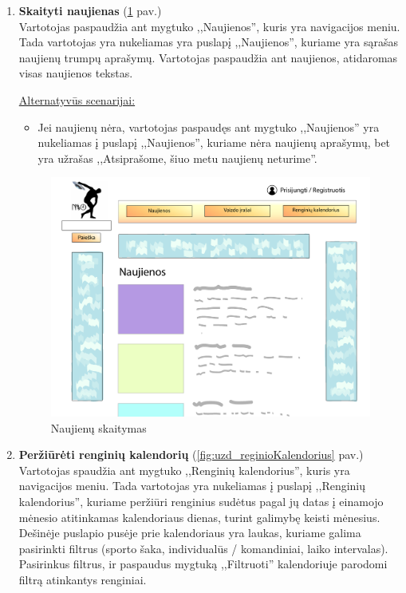 \documentclass{VUMIFPSkursinis}
\begin{document}
		\begin{enumerate} [label = \textbf{U\arabic*.}]
			\item \textbf{Skaityti naujienas} (\ref{fig:uzd_skaitymas} pav.)\\
				Vartotojas paspaudžia ant mygtuko ,,Naujienos'', kuris yra navigacijos meniu. Tada vartotojas yra nukeliamas yra puslapį ,,Naujienos'', kuriame yra sąrašas naujienų trumpų aprašymų. Vartotojas paspaudžia ant naujienos, atidaromas visas naujienos tekstas.
				
				\underline{Alternatyvūs scenarijai:}
				\begin{itemize}
					\item Jei naujienų nėra, vartotojas paspaudęs ant mygtuko ,,Naujienos'' yra nukeliamas į puslapį ,,Naujienos'', kuriame nėra naujienų aprašymų, bet yra užrašas ,,Atsiprašome, šiuo metu naujienų neturime''. 
				\end{itemize}

				\begin{figure}[H]
					\centering
					\includegraphics[width=\textwidth]{img/PSI4/Naujienos-01.jpg}
					\caption{Naujienų skaitymas}
					\label{fig:uzd_skaitymas}
				\end{figure}
				
			\item \textbf{Peržiūrėti renginių kalendorių} (\ref{fig:uzd_reginioKalendorius} pav.)\\
				Vartotojas spaudžia ant mygtuko ,,Renginių kalendorius'', kuris yra navigacijos meniu. Tada vartotojas yra nukeliamas į puslapį ,,Renginių kalendorius'', kuriame peržiūri renginius sudėtus pagal jų datas į einamojo mėnesio atitinkamas kalendoriaus dienas, turint galimybę keisti mėnesius. Dešinėje puslapio pusėje prie kalendoriaus yra laukas, kuriame galima pasirinkti filtrus (sporto šaka, individualūs / komandiniai, laiko intervalas). Pasirinkus filtrus, ir paspaudus mygtuką ,,Filtruoti'' kalendoriuje parodomi filtrą atinkantys renginiai.
					

\end{enumerate}
\end{document}

